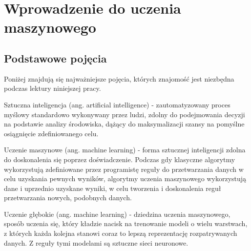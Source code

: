 \chapter{Wprowadzenie do uczenia maszynowego}
\thispagestyle{chapterBeginStyle}
\label{chapter2}


\section{Podstawowe pojęcia}
Poniżej znajdują się najważniejsze pojęcia, których znajomość jest niezbędna podczas lektury niniejszej pracy.

Sztuczna inteligencja (ang. artificial intelligence) - zautomatyzowany proces myślowy standardowo wykonywany przez ludzi, zdolny do podejmowania decyzji na podstawie analizy środowiska, dążący do maksymalizacji szansy na pomyślne osiągnięcie zdefiniowanego celu.

Uczenie maszynowe (ang. machine learning) - forma sztucznej inteligencji zdolna do doskonalenia się poprzez doświadczenie. Podczas gdy klasyczne algorytmy wykorzystują zdefiniowane przez programistę reguły do przetwarzania danych w celu uzyskania pewnych wyników, algorytmy uczenia maszynowego wykorzystują dane i uprzednio uzyskane wyniki, w celu tworzenia i doskonalenia reguł przetwarzania nowych, podobnych danych.

Uczenie głębokie (ang. machine learning) - dziedzina uczenia maszynowego, sposób uczenia się, który kładzie nacisk na trenowanie modeli o wielu warstwach, z których każda kolejna stanowi coraz to lepszą reprezentację rozpatrywanych danych. Z reguły tymi modelami są sztuczne sieci neuronowe.

